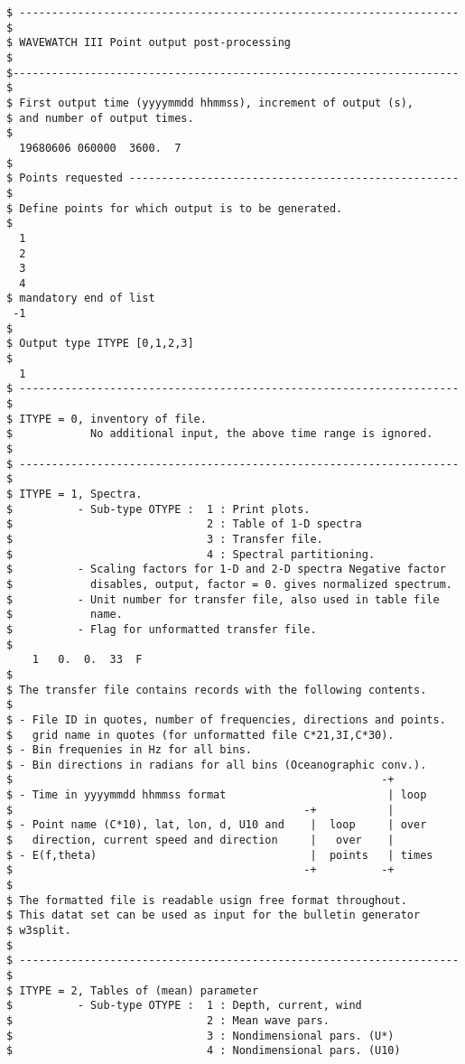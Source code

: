 \begin{verbatim}
$ -------------------------------------------------------------------- $
$ WAVEWATCH III Point output post-processing                           $
$--------------------------------------------------------------------- $
$ First output time (yyyymmdd hhmmss), increment of output (s), 
$ and number of output times.
$
  19680606 060000  3600.  7
$
$ Points requested --------------------------------------------------- $
$ Define points for which output is to be generated. 
$
  1
  2
  3
  4
$ mandatory end of list
 -1
$
$ Output type ITYPE [0,1,2,3]
$
  1
$ -------------------------------------------------------------------- $
$ ITYPE = 0, inventory of file.
$            No additional input, the above time range is ignored.
$
$ -------------------------------------------------------------------- $
$ ITYPE = 1, Spectra.
$          - Sub-type OTYPE :  1 : Print plots.
$                              2 : Table of 1-D spectra
$                              3 : Transfer file.
$                              4 : Spectral partitioning.
$          - Scaling factors for 1-D and 2-D spectra Negative factor
$            disables, output, factor = 0. gives normalized spectrum.
$          - Unit number for transfer file, also used in table file
$            name.
$          - Flag for unformatted transfer file.
$
    1   0.  0.  33  F
$
$ The transfer file contains records with the following contents.
$
$ - File ID in quotes, number of frequencies, directions and points.
$   grid name in quotes (for unformatted file C*21,3I,C*30).
$ - Bin frequenies in Hz for all bins.
$ - Bin directions in radians for all bins (Oceanographic conv.).
$                                                         -+
$ - Time in yyyymmdd hhmmss format                         | loop
$                                             -+           |
$ - Point name (C*10), lat, lon, d, U10 and    |  loop     | over
$   direction, current speed and direction     |   over    |
$ - E(f,theta)                                 |  points   | times
$                                             -+          -+
$
$ The formatted file is readable usign free format throughout.
$ This datat set can be used as input for the bulletin generator
$ w3split.
$
$ -------------------------------------------------------------------- $
$ ITYPE = 2, Tables of (mean) parameter
$          - Sub-type OTYPE :  1 : Depth, current, wind
$                              2 : Mean wave pars.
$                              3 : Nondimensional pars. (U*)
$                              4 : Nondimensional pars. (U10)

\end{verbatim}
